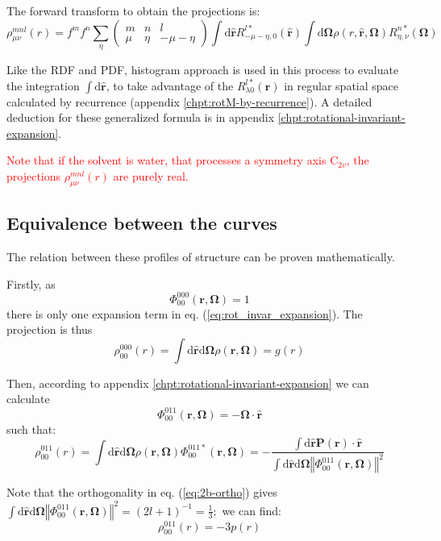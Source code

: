 The forward transform to obtain the projections is:
\begin{equation}
\rho_{\mu\nu}^{mnl}(r)=f^{m}f^{n}\sum_{\eta}\left(\begin{array}{ccc}
m & n & l\\
\mu & \eta & -\mu-\eta
\end{array}\right)\int\mathrm{d}\hat{\mathbf{r}}R_{-\mu-\eta,0}^{l*}(\mathbf{\hat{r}})\int\mathrm{d}\mathbf{\Omega}\rho(r,\hat{\mathbf{r}},\mathbf{\Omega})R_{\eta,\nu}^{n*}(\mathbf{\Omega})
\end{equation}

Like the \acs{RDF} and \acs{PDF}, histogram approach is used in
this process to evaluate the integration $\int\mathrm{d}\hat{\mathbf{r}}$,
to take advantage of the $R_{\lambda0}^{l*}(\mathbf{\hat{r}})$ in
regular spatial space calculated by recurrence (appendix \ref{chpt:rotM-by-recurrence}).
A detailed deduction for these generalized formula is in appendix
\ref{chpt:rotational-invariant-expansion}.

\textcolor{red}{Note that if the solvent is water, that processes
a symmetry axis $\mathrm{C}_{2v}$, the projections $\rho_{\mu\nu}^{mnl}(r)$
are purely real.}

\subsection{Equivalence between the curves}

The relation between these profiles of structure can be proven mathematically.

Firstly, as
\begin{equation}
\Phi_{00}^{000}(\mathbf{r},\mathbf{\Omega})=1
\end{equation}
there is only one expansion term in eq. (\ref{eq:rot_invar_expansion}).
The projection is thus
\begin{equation}
\rho_{00}^{000}(r)=\int\mathrm{d}\hat{\mathbf{r}}\mathrm{d}\mathbf{\Omega}\rho(\mathbf{r},\mathbf{\Omega})=g(r)
\end{equation}

Then, according to appendix \ref{chpt:rotational-invariant-expansion}
we can calculate
\begin{equation}
\Phi_{00}^{011}(\mathbf{r},\mathbf{\Omega})=-\mathbf{\Omega}\cdot\hat{\mathbf{r}}
\end{equation}
such that:
\begin{equation}
\rho_{00}^{011}(r)=\int\mathrm{d}\hat{\mathbf{r}}\mathrm{d}\mathbf{\Omega}\rho(\mathbf{r},\mathbf{\Omega})\Phi_{00}^{011*}(\mathbf{r},\mathbf{\Omega})=-\dfrac{\int\mathrm{d}\hat{\mathbf{r}}\mathbf{P}(\mathbf{r})\cdot\hat{\mathbf{r}}}{\int\mathrm{d}\hat{\mathbf{r}}\mathrm{d}\mathbf{\Omega}\left\Vert \Phi_{00}^{011}(\mathbf{r},\mathbf{\Omega})\right\Vert ^{2}}
\end{equation}

Note that the orthogonality in eq. (\ref{eq:2b-ortho}) gives $\int\mathrm{d}\hat{\mathbf{r}}\mathrm{d}\mathbf{\Omega}\left\Vert \Phi_{00}^{011}(\mathbf{r},\mathbf{\Omega})\right\Vert ^{2}=\left(2l+1\right)^{-1}=\frac{1}{3};$
we can find:
\begin{equation}
\rho_{00}^{011}(r)=-3p(r)
\end{equation}

